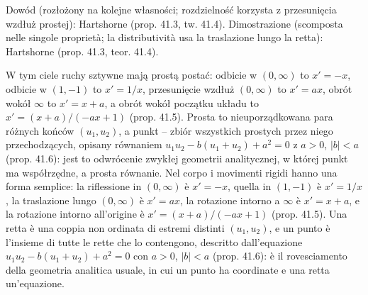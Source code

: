 Dowód (rozłożony na kolejne własności; rozdzielność korzysta z przesunięcia wzdłuż prostej): Hartshorne \cite[s. 390--392]{hartshorne_2000} (prop. 41.3, tw. 41.4). %
Dimostrazione (scomposta nelle singole proprietà; la distributività usa la traslazione lungo la retta): Hartshorne \cite[p. 390--392]{hartshorne_2000} (prop. 41.3, teor. 41.4). %

W tym ciele ruchy sztywne mają prostą postać: odbicie w $(0,\infty)$ to $x' = -x$, odbicie w $(1,-1)$ to $x' = 1/x$, przesunięcie wzdłuż $(0,\infty)$ to $x' = ax$, obrót wokół $\infty$ to $x' = x + a$, a obrót wokół początku układu to $x' = (x+a)/(-ax+1)$ \cite[s. 392--393]{hartshorne_2000} (prop. 41.5). %
Prosta to nieuporządkowana para różnych końców $(u_1, u_2)$, a punkt -- zbiór wszystkich prostych przez niego przechodzących, opisany równaniem $u_1u_2 - b(u_1+u_2) + a^2 = 0$ z $a > 0$, $|b| < a$ \cite[s. 394]{hartshorne_2000} (prop. 41.6): jest to odwrócenie zwykłej geometrii analitycznej, w której punkt ma współrzędne, a prosta równanie. %
Nel corpo i movimenti rigidi hanno una forma semplice: la riflessione in $(0,\infty)$ è $x' = -x$, quella in $(1,-1)$ è $x' = 1/x$, la traslazione lungo $(0,\infty)$ è $x' = ax$, la rotazione intorno a $\infty$ è $x' = x + a$, e la rotazione intorno all'origine è $x' = (x+a)/(-ax+1)$ \cite[p. 392--393]{hartshorne_2000} (prop. 41.5). %
Una retta è una coppia non ordinata di estremi distinti $(u_1, u_2)$, e un punto è l'insieme di tutte le rette che lo contengono, descritto dall'equazione $u_1u_2 - b(u_1+u_2) + a^2 = 0$ con $a > 0$, $|b| < a$ \cite[p. 394]{hartshorne_2000} (prop. 41.6): è il rovesciamento della geometria analitica usuale, in cui un punto ha coordinate e una retta un'equazione. %

